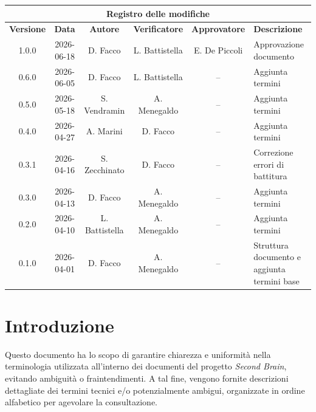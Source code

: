 \documentclass[a4paper, 10pt, colorlinks=true, linkcolor=black, urlcolor=blue, citecolor=blue, hidelinks]{article}
\begin{document}
\newcommand{\tipoverbale}{Glossario}
\newcommand{\dataversione}{2026-06-18}
\newcommand{\versione}{1.0.0}
\newcommand{\stato}{Approvato}
\newcommand{\destinatari}{Prof. Tullio Vardanega, prof. Riccardo Cardin, The Bitless}
\newcommand{\dir}{../../..}
\newcommand{\dataverbale}{}


\newpage

\begin{center}
    \begin{tabularx}{\textwidth}{|c|c|c|c|c|>{\raggedright\arraybackslash}X|}
        \hline
        \multicolumn{6}{|c|}{\textbf{Registro delle modifiche}} \\
        \hline
        \textbf{Versione} & \textbf{Data} & \textbf{Autore} & \textbf{Verificatore} & \textbf{Approvatore} & \textbf{Descrizione} \\
        \hline
        1.0.0 & 2026-06-18 & D. Facco & L. Battistella & E. De Piccoli & Approvazione documento \\
        \hline
        0.6.0 & 2026-06-05 & D. Facco & L. Battistella & -- & Aggiunta termini \\
        \hline
        0.5.0 & 2026-05-18 & S. Vendramin & A. Menegaldo & -- & Aggiunta termini \\
        \hline
        0.4.0 & 2026-04-27 &  A. Marini & D. Facco & -- & Aggiunta termini \\
        \hline
        0.3.1 & 2026-04-16 & S. Zecchinato & D. Facco & -- & Correzione errori di battitura \\
        \hline
        0.3.0 & 2026-04-13 & D. Facco & A. Menegaldo & -- & Aggiunta termini \\
        \hline
        0.2.0 & 2026-04-10 & L. Battistella & A. Menegaldo & -- & Aggiunta termini \\
        \hline
        0.1.0 & 2026-04-01 & D. Facco & A. Menegaldo & -- & Struttura documento e aggiunta termini base \\
        \hline
    \end{tabularx}
\end{center}

\newpage

\tableofcontents
\newpage


\section{Introduzione}
Questo documento ha lo scopo di garantire chiarezza e uniformità nella terminologia utilizzata all'interno dei documenti del progetto \textit{Second Brain}, evitando ambiguità o fraintendimenti. A tal fine, vengono fornite descrizioni dettagliate dei termini tecnici e/o potenzialmente ambigui, organizzate in ordine alfabetico per agevolare la consultazione.
\end{document}
